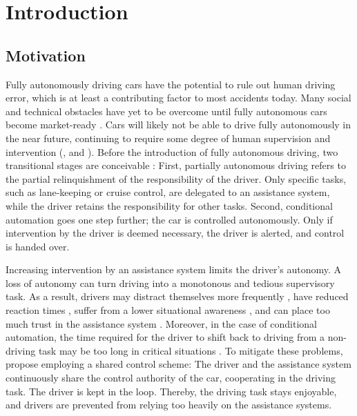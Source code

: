 \chapter{Introduction}
\label{sec:intro}

\section{Motivation}


Fully autonomously driving cars have the potential to rule out human driving error, which is at least a contributing factor to most accidents today. Many social and technical obstacles have yet to be overcome until fully autonomous cars become market-ready \parencite{autonomous_driving_book}. Cars will likely not be able to drive fully autonomously in the near future, continuing to require some degree of human supervision and intervention (\cite{human-needed}, and \cite{human-needed-2}). Before the introduction of fully autonomous driving, two transitional stages are conceivable \parencite{shared_control}: First, partially autonomous driving refers to the partial relinquishment of the responsibility of the driver. Only specific tasks, such as lane-keeping or cruise control, are delegated to an assistance system, while the driver retains the responsibility for other tasks. Second, conditional automation goes one step further; the car is controlled autonomously. Only if intervention by the driver is deemed necessary, the driver is alerted, and control is handed over. 

Increasing intervention by an assistance system limits the driver's autonomy. A loss of autonomy can turn driving into a monotonous and tedious supervisory task. As a result, drivers may distract themselves more frequently \parencite{driver-distraction}, have reduced reaction times \parencite{reaction-time}, suffer from a lower situational awareness \parencite{situational-awareness}, and can place too much trust in the assistance system \parencite{over-trust}. Moreover, in the case of conditional automation, the time required for the driver to shift back to driving from a non-driving task may be too long in critical situations \parencite{takeover-time}. To mitigate these problems, \cite{shared-control-haptics} propose employing a shared control scheme: The driver and the assistance system continuously share the control authority of the car, cooperating in the driving task. The driver is kept in the loop. Thereby, the driving task stays enjoyable, and drivers are prevented from relying too heavily on the assistance systems.

